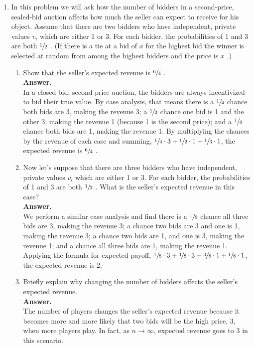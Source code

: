 \documentclass[twoside]{article}
\begin{document}
\begin{enumerate}
\item In this problem we will ask how the number of bidders in a second-price, sealed-bid auction affects how much the seller can expect to receive for his object. Assume that there are two bidders who have independent, private values $ v_{i} $ which are either 1 or 3. For each bidder, the probabilities of 1 and 3 are both $ \sfrac{1}{2} $ . (If there is a tie at a bid of $ x $ for the highest bid the winner is selected at random from among the highest bidders and the price is $ x $ .)

\begin{enumerate}

\item Show that the seller's expected revenue is $ \sfrac{6}{4} $ .\\

\textbf{Answer.} \\
In a closed-bid, second-price auction, the bidders are always incentivized to bid their true value.
By case analysis, that means there is a $ \sfrac{1}{4} $ chance both bids are 3, making the revenue 3;
a $ \sfrac{1}{2} $ chance one bid is 1 and the other 3, making the revenue 1 (because 1 is the second price);
and a $ \sfrac{1}{4} $ chance both bids are 1, making the revenue 1.
By multiplying the chances by the revenue of each case and summing, $ \sfrac{1}{4} \cdot 3 + \sfrac{1}{2} \cdot 1 + \sfrac{1}{3} \cdot 1 $, the expected revenue is $ \sfrac{6}{4} $ . \\

\newpage

\item Now let's suppose that there are three bidders who have independent, private values $ v_{i} $ which are either 1 or 3. For each bidder, the probabilities of 1 and 3 are both $ \sfrac{1}{2} $ . What is the seller's expected revenue in this case? \\

\textbf{Answer.} \\
We perform a similar case analysis and find there is a $ \sfrac{1}{8} $ chance all three bids are 3, making the revenue 3;
a  chance two bids are 3 and one is 1, making the revenue 3;
a  chance two bids are 1, and one is 3, making the revenue 1;
and a  chance all three bids are 1, making the revenue 1.
Applying the formula for expected payoff, $ \sfrac{1}{8} \cdot 3 + \sfrac{3}{8} \cdot 3 + \sfrac{3}{8} \cdot 1 + \sfrac{1}{8} \cdot 1 $, the expected revenue is 2. \\

\item Briefly explain why changing the number of bidders affects the seller's expected revenue. \\

\textbf{Answer.} \\
The number of players changes the seller's expected revenue because it becomes more and more likely that two bids will be the high price, 3, when more players play.
In fact, as $ n \rightarrow \infty $, expected revenue goes to 3 in this scenario.

\end{enumerate}


\end{enumerate}
\end{document}
